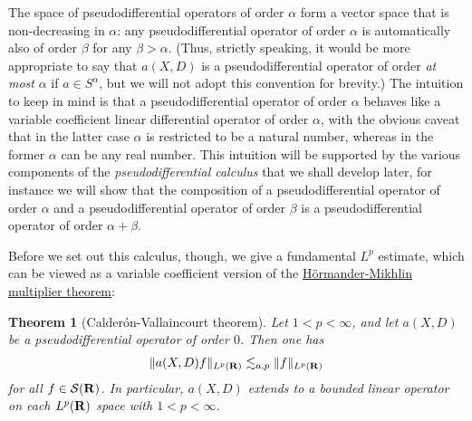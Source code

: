 \documentclass[11pt]{article}
\newtheorem{theorem}{Theorem}
\theoremstyle{definition}
\theoremstyle{remark}
\begin{document}
The space of pseudodifferential operators of order \({\alpha}\) form a vector space that is non-decreasing in \({\alpha}\): any pseudodifferential operator of order \({\alpha}\) is automatically also of order \({\beta}\) for any \({\beta>\alpha}\). (Thus, strictly speaking, it would be more appropriate to say that \({a(X,D)}\) is a pseudodifferential operator of order \emph{at most} \({\alpha}\) if \({a \in S^\alpha}\), but we will not adopt this convention for brevity.) The intuition to keep in mind is that a pseudodifferential operator of order \({\alpha}\) behaves like a variable coefficient linear differential operator of order \({\alpha}\), with the obvious caveat that in the latter case \({\alpha}\) is restricted to be a natural number, whereas in the former \({\alpha}\) can be any real number. This intuition will be supported by the various components of the \emph{pseudodifferential calculus} that we shall develop later, for instance we will show that the composition of a pseudodifferential operator of order \({\alpha}\) and a pseudodifferential operator of order \({\beta}\) is a pseudodifferential operator of order \({\alpha+\beta}\).


Before we set out this calculus, though, we give a fundamental \({L^p}\) estimate, which can be viewed as a variable coefficient version of the \href{https://en.wikipedia.org/wiki/Multiplier_(Fourier_analysis)#Mikhlin_multiplier_theorem}{Hörmander-Mikhlin multiplier theorem}:

\begin{theorem}[Calderón-Vallaincourt theorem]
 \label{cv} Let \({1 < p < \infty}\), and let \({a(X,D)}\) be a pseudodifferential operator of order \({0}\). Then one has 
\begin{align}\label{clp}
  \| a(X,D) f\|_{L^p({\bf R})} \lesssim_{a,p} \|f\|_{L^p({\bf R})} 
\end{align}
 for all \({f \in {\mathcal S}({\bf R})}\). In particular, \({a(X,D)}\) extends to a bounded linear operator on each \({L^p({\bf R})}\) space with \({1 < p < \infty}\). 
\end{theorem}
\end{document}
